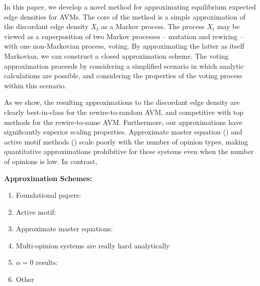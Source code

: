 \documentclass[english]{scrartcl}
\begin{document}
	In this paper, we develop a novel method for approximating equilibrium expected edge densities for AVMs. 
	The core of the method is a simple approximation of the discordant edge density $X_t$ as a Markov process.
	The process $X_t$ may be viewed as a superposition of two Markov processes -- mutation and rewiring -- with one non-Markovian process, voting. 
	By approximating the latter as itself Markovian, we can construct a closed approximation scheme. 
	The voting approximation proceeds by considering a simplified scenario in which analytic calculations are possible, and considering the properties of the voting process within this scenario. 

	As we show, the resulting approximations to the discordant edge density are clearly best-in-class for the rewire-to-random AVM, and competitive with top methods for the rewire-to-same AVM. 
	Furthermore, our approximations have significantly superior scaling properties. 
	Approximate master equation (\cite{Shi2013}) and active motif methods (\cite{Bohme2012}) scale poorly with the number of opinion types, making quantitative approximations prohibitive for these systems even when the number of opinions is low. 
	In contrast, 


	





	 
	\textbf{Approximation Schemes:}
	\begin{enumerate}
		\item Foundational papers: \cite{Kimura2008,Holme2006}
		\item Active motif: \cite{Silk2014,Bohme2011,Bohme2012}
		\item Approximate master equations: \cite{Durrett2012,Lee2017,Malik2016,Gleeson2011}
		\item Multi-opinion systems are really hard analytically \cite{Shi2013,Bohme2012}
		\item $\alpha = 0$ results: \cite{GRANOVSKY1995,Allen2012}
		\item Other \cite{Rogers2013}
	\end{enumerate}
\end{document}
